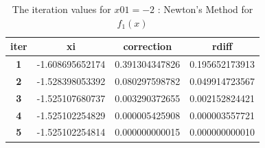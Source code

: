 \documentclass[a4paper, 12pt]{report}
\begin{document}
\begin{table}[h]
\centering
\begin{tabular}{|c|l|l|l|}
\hline
\textbf{iter} & \multicolumn{1}{c|}{\textbf{xi}} & \multicolumn{1}{c|}{\textbf{correction}} & \multicolumn{1}{c|}{\textbf{rdiff}} \\ \hline
\textbf{1} & -1.608695652174 & 0.391304347826 & 0.195652173913 \\ \hline
\textbf{2} & -1.528398053392 & 0.080297598782 & 0.049914723567 \\ \hline
\textbf{3} & -1.525107680737 & 0.003290372655 & 0.002152824421 \\ \hline
\textbf{4} & -1.525102254829 & 0.000005425908 & 0.000003557721 \\ \hline
\textbf{5} & -1.525102254814 & 0.000000000015 & 0.000000000010 \\ \hline
\end{tabular}
\caption{The iteration values for $x01 = -2$ : Newton's Method for $f_{1}(x)$}
\label{table:5}
\end{table}
\end{document}

